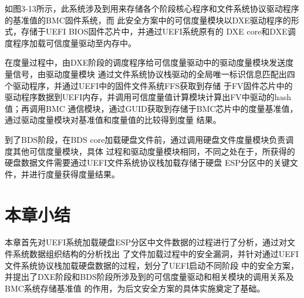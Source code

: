如图3-13所示，此系统涉及到用来存储各个阶段核心程序和文件系统协议驱动程序的基准值的BMC固件系统，而
此安全方案中的可信度量模块以DXE驱动程序的形式，存储于UEFI BIOS固件芯片中，并通过UEFI系统原有的
DXE core和DXE调度程序加载可信度量驱动至内存中。
\par 在度量过程中，由DXE阶段的调度程序给可信度量驱动中的驱动度量模块发送度量信号，由驱动度量模块
通过文件系统协议栈驱动的全局唯一标识信息匹配出四个驱动程序，并通过UEFI中的固件文件系统FFS获取到存储
于FV固件芯片中的驱动程序数据到UEFI内存，并调用可信度量值计算模块计算出FV中驱动的hash值；再调用BMC
通信模块，通过GUID获取到存储于BMC芯片中的度量基准值，通过驱动度量模块对基准值和度量值的比较得到度量
结果。
\par 到了BDS阶段，在BDS core加载硬盘文件前，通过调用硬盘文件度量模块负责调度其他可信度量模块，具体
过程和驱动度量模块相同，不同之处在于，所获得的硬盘数据文件需要通过UEFI文件系统协议栈加载存储于硬盘
ESP分区中的关键文件，并进行度量获得度量结果。

%
%
\section{本章小结}
本章首先对UEFI系统加载硬盘ESP分区中文件数据的过程进行了分析，通过对文件系统数据组织结构的分析找出
了文件加载过程中的安全漏洞，并针对通过UEFI文件系统协议栈加载硬盘数据的过程，划分了UEFI启动不同阶段
中的安全方案，并提出了DXE阶段和BDS阶段所涉及到的可信度量驱动和相关模块的调用关系及BMC系统存储基准值
的作用，为后文安全方案的具体实施奠定了基础。

